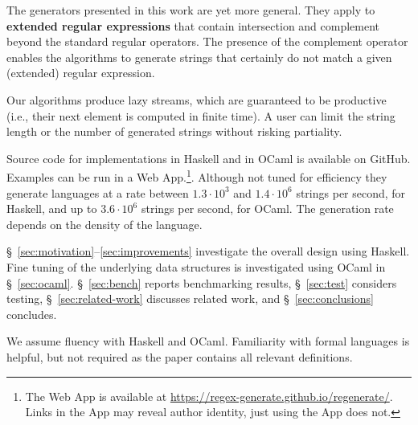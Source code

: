 The generators presented in this work are yet more general. They
apply to \textbf{extended regular expressions} that contain
intersection and complement beyond the standard regular operators. The presence
of the complement operator enables the algorithms to generate strings
that certainly do not match a given (extended) regular expression.

Our algorithms produce lazy streams, which are guaranteed to be
productive (i.e., their next element is computed in finite time). A
user can limit the string length or the number of generated strings
without risking partiality.

Source code for implementations in Haskell and in OCaml is available
on GitHub. Examples can be run in a Web App.\footnote{%
  The Web App is available at
  \url{https://regex-generate.github.io/regenerate/}.  Links in the App may
  reveal author identity, just using the App does not.  }.  Although
not tuned for efficiency they generate languages at a rate
between $1.3\cdot10^3$ and $1.4\cdot10^6$ strings per second, for
Haskell, and up to $3.6\cdot10^6$ strings per second, for OCaml. The
generation rate depends on the density of the language.

\S~\ref{sec:motivation}--\ref{sec:improvements} investigate the
overall design using Haskell. Fine tuning of the underlying data
structures is investigated using OCaml in \S~\ref{sec:ocaml}.
\S~\ref{sec:bench} reports benchmarking results, \S~\ref{sec:test}
considers testing, \S~\ref{sec:related-work} discusses related work,
and \S~\ref{sec:conclusions} concludes.

We assume fluency with Haskell and OCaml. 
Familiarity with formal languages is helpful, but not required as the
paper contains all relevant definitions. 

